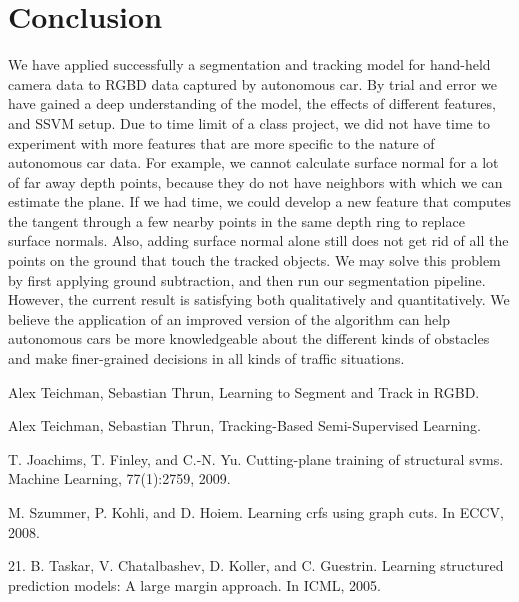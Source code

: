 \documentclass[10pt,twocolumn,letterpaper]{article}
\begin{document}
\section{Conclusion}
We have applied successfully a segmentation and tracking model for hand-held
camera data to RGBD data captured by autonomous car.
By trial and error we have gained a deep understanding of the model, 
the effects of different features, and SSVM setup. Due to time limit of a class
project, we did not have time to experiment with more features that are more
specific to the nature of autonomous car data. For example,
we cannot calculate surface normal for a lot of far away depth points, because
they do not have neighbors with which we can estimate the plane. If we had
time, we could 
develop a new feature that computes the tangent through a few nearby points
in the same depth ring to replace surface normals. Also, adding surface normal alone still does not get rid of all the points on the ground that touch the tracked objects. We may solve this problem by first applying ground subtraction, and then run our segmentation pipeline.
 However, the current result is satisfying both qualitatively and quantitatively.
 We believe the application of an improved version of the algorithm can help
 autonomous cars be more knowledgeable about the different kinds of obstacles 
 and make finer-grained decisions in all kinds of traffic situations.


{\small


\begin{thebibliography}{20}
  Alex Teichman, Sebastian Thrun,
  Learning to Segment and Track in RGBD.

  Alex Teichman, Sebastian Thrun,
  Tracking-Based Semi-Supervised Learning.

T. Joachims, T. Finley, and C.-N. Yu. Cutting-plane training of structural svms. Machine
Learning, 77(1):2759, 2009.

M. Szummer, P. Kohli, and D. Hoiem. Learning crfs using graph cuts. In ECCV, 2008.

21. B. Taskar, V. Chatalbashev, D. Koller, and C. Guestrin. Learning structured prediction models:
A large margin approach. In ICML, 2005.

\end{thebibliography}


}
\end{document}
